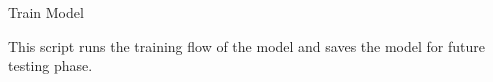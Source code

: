 \begin{section}{Train Model}
    \par This script runs the training flow of the model and saves the model for future testing phase.
    
\end{section}
\clearpage